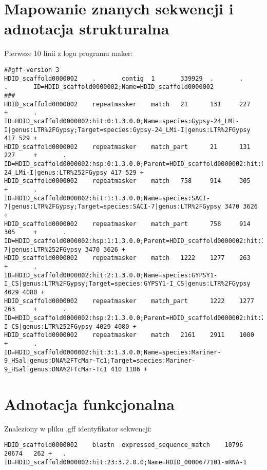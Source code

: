 \documentclass[a4paper]{article}
\begin{document}
\section{Mapowanie znanych sekwencji i adnotacja strukturalna}
Pierwsze 10 linii z logu programu maker:
\begin{verbatim}
##gff-version 3
HDID_scaffold0000002    .       contig  1       339929  .       .       .       ID=HDID_scaffold0000002;Name=HDID_scaffold0000002
###
HDID_scaffold0000002    repeatmasker    match   21      131     227     +       .       ID=HDID_scaffold0000002:hit:0:1.3.0.0;Name=species:Gypsy-24_LMi-I|genus:LTR%2FGypsy;Target=species:Gypsy-24_LMi-I|genus:LTR%2FGypsy 417 529 +
HDID_scaffold0000002    repeatmasker    match_part      21      131     227     +       .       ID=HDID_scaffold0000002:hsp:0:1.3.0.0;Parent=HDID_scaffold0000002:hit:0:1.3.0.0;Target=species:Gypsy-24_LMi-I|genus:LTR%252FGypsy 417 529 +
HDID_scaffold0000002    repeatmasker    match   758     914     305     +       .       ID=HDID_scaffold0000002:hit:1:1.3.0.0;Name=species:SACI-7|genus:LTR%2FGypsy;Target=species:SACI-7|genus:LTR%2FGypsy 3470 3626 +
HDID_scaffold0000002    repeatmasker    match_part      758     914     305     +       .       ID=HDID_scaffold0000002:hsp:1:1.3.0.0;Parent=HDID_scaffold0000002:hit:1:1.3.0.0;Target=species:SACI-7|genus:LTR%252FGypsy 3470 3626 +
HDID_scaffold0000002    repeatmasker    match   1222    1277    263     +       .       ID=HDID_scaffold0000002:hit:2:1.3.0.0;Name=species:GYPSY1-I_CS|genus:LTR%2FGypsy;Target=species:GYPSY1-I_CS|genus:LTR%2FGypsy 4029 4080 +
HDID_scaffold0000002    repeatmasker    match_part      1222    1277    263     +       .       ID=HDID_scaffold0000002:hsp:2:1.3.0.0;Parent=HDID_scaffold0000002:hit:2:1.3.0.0;Target=species:GYPSY1-I_CS|genus:LTR%252FGypsy 4029 4080 +
HDID_scaffold0000002    repeatmasker    match   2161    2911    1000    +       .       ID=HDID_scaffold0000002:hit:3:1.3.0.0;Name=species:Mariner-9_HSal|genus:DNA%2FTcMar-Tc1;Target=species:Mariner-9_HSal|genus:DNA%2FTcMar-Tc1 410 1106 +
\end{verbatim}

\section{Adnotacja funkcjonalna}
Znaleziony w pliku .gff identyfikator sekwencji:
\begin{verbatim}
HDID_scaffold0000002	blastn	expressed_sequence_match	10796	20674	262	+	.	ID=HDID_scaffold0000002:hit:23:3.2.0.0;Name=HDID_0000677101-mRNA-1
\end{verbatim}
\end{document}
